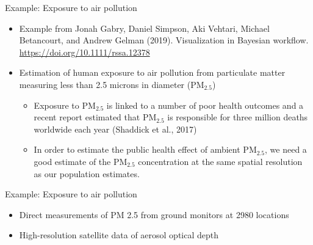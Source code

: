 \documentclass[t]{beamer}
\begin{document}

\begin{frame}{Example: Exposure to air pollution}

  \begin{itemize}
  \item Example from Jonah Gabry, Daniel Simpson, Aki Vehtari, Michael
    Betancourt, and Andrew Gelman (2019). Visualization in Bayesian
    workflow. \url{https://doi.org/10.1111/rssa.12378}
  \item Estimation of human exposure to air pollution from particulate
    matter measuring less than 2.5 microns in diameter ($\mathrm{PM}_{2.5}$)
    \begin{itemize}
    \item Exposure to $\mathrm{PM}_{2.5}$ is linked to a number of
      poor health outcomes and a recent report estimated that
      $\mathrm{PM}_{2.5}$ is responsible for three million deaths
      worldwide each year (Shaddick et al., 2017)
    \item In order to estimate the public health effect of ambient
      $\mathrm{PM}_{2.5}$, we need a good estimate of the
      $\mathrm{PM}_{2.5}$ concentration at the same spatial resolution
      as our population estimates.
    \end{itemize}
\end{itemize}

\end{frame}

\begin{frame}{Example: Exposure to air pollution}

  \begin{itemize}
  \item Direct measurements of PM 2.5 from ground monitors at 2980
    locations
  \item High-resolution satellite data of aerosol optical depth
    
  \end{itemize}
  \begin{center}
\end{center}
\end{frame}
\end{document}
